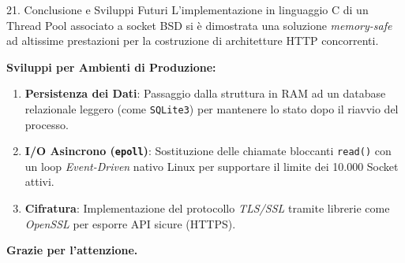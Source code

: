 \documentclass[aspectratio=169, 10pt]{beamer}
\begin{document}
\begin{frame}{21. Conclusione e Sviluppi Futuri}
    L'implementazione in linguaggio C di un Thread Pool associato a socket BSD si è dimostrata una soluzione \textit{memory-safe} ad altissime prestazioni per la costruzione di architetture HTTP concorrenti.

    \vspace{0.4cm}
    \textbf{Sviluppi per Ambienti di Produzione:}
    \begin{enumerate}
        \item \textbf{Persistenza dei Dati}: Passaggio dalla struttura in RAM ad un database relazionale leggero (come \texttt{SQLite3}) per mantenere lo stato dopo il riavvio del processo.
        \item \textbf{I/O Asincrono (\texttt{epoll})}: Sostituzione delle chiamate bloccanti \texttt{read()} con un loop \textit{Event-Driven} nativo Linux per supportare il limite dei 10.000 Socket attivi.
        \item \textbf{Cifratura}: Implementazione del protocollo \textit{TLS/SSL} tramite librerie come \textit{OpenSSL} per esporre API sicure (HTTPS).
    \end{enumerate}
    
    \vspace{0.5cm}
    \centering
    \Large \textbf{Grazie per l'attenzione.}
\end{frame}
\end{document}
